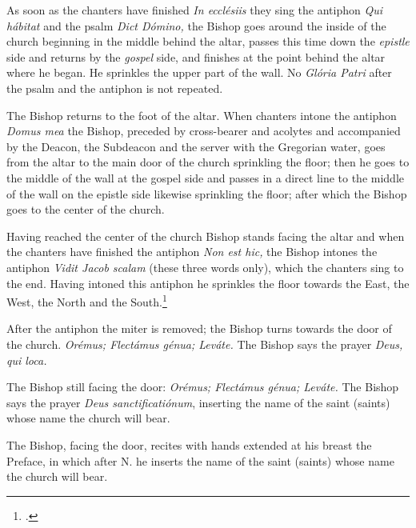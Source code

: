 \documentclass[letterpaper]{report}
\begin{document}
{    \rubric As soon as the chanters have finished \textit{In eccl\'esiis} they
    sing the antiphon \textit{Qui h\'abitat} and the psalm \textit{Dict
    D\'omino,} the Bishop goes around the inside of the church beginning in the
    middle behind the altar, passes this time down the \textit{epistle} side
    and returns by the \textit{gospel} side, and finishes at the point behind
    the altar where he began. He sprinkles the upper part of the wall. No
    \textit{Glória Patri} after the psalm and the antiphon is not repeated.

    \rubric The Bishop returns to the foot of the altar. When chanters intone
    the antiphon \textit{Domus mea} the Bishop, preceded by cross-bearer and
    acolytes and accompanied by the Deacon, the Subdeacon and the server with
    the Gregorian water, goes from the altar to the main door of the church
    sprinkling the floor; then he goes to the middle of the wall at the gospel
    side and passes in a direct line to the middle of the wall on the epistle
    side likewise sprinkling the floor; after which the Bishop goes to the
    center of the church.

    \rubric Having reached the center of the church Bishop stands facing the
    altar and when the chanters have finished the antiphon \textit{Non est
    hic,} the Bishop intones the antiphon \textit{Vidit Jacob scalam} (these
    three words only), which the chanters sing to the end. Having intoned this
    antiphon he sprinkles the floor towards the East, the West, the North and
    the South.\footcite[The Rubric in the \textit{Pontificale Romanum} supposes
    the altar to be towards the East; the bishop, therefore, sprinkles the
    floor before him, behind him, at his left and than at his right.][footnote
    1, p. 74.]{consecranda}

    \rubric After the antiphon the miter is removed; the Bishop turns towards
    the door of the church. \textit{Orémus; Flectámus génua; Leváte.} The
    Bishop says the prayer \textit{Deus, qui loca.}

    \rubric The Bishop still facing the door: \textit{Orémus; Flectámus génua;
    Leváte.} The Bishop says the prayer \textit{Deus sanctificatiónum},
    inserting the name of the saint (saints) whose name the church will bear.

    \rubric The Bishop, facing the door, recites with hands extended at his
    breast the Preface, in which after N. he inserts the name of the saint
    (saints) whose name the church will bear.

}
\end{document}
